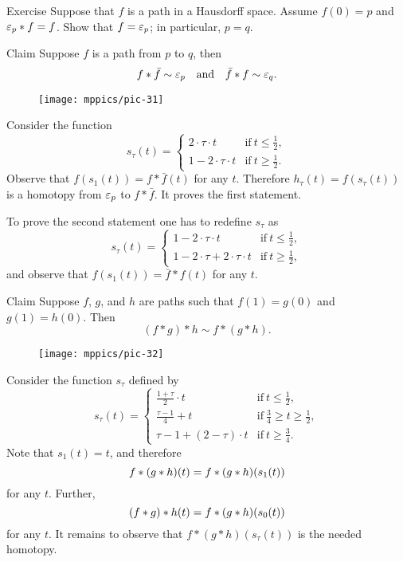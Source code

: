 \begin{thm}{Exercise}\label{ex:neutral}
Suppose that $f$ is a path in a Hausdorff space.
Assume $f(0)=p$ and $\varepsilon_p*f= f$.
Show that $f=\varepsilon_p$; in particular, $p=q$.
\end{thm}

\begin{thm}{Claim}\label{clm:f-bar-f}
Suppose $f$ is a path from $p$ to $q$, then
\[f*\bar f\sim \varepsilon_p
\quad\text{and}\quad
\bar f*f\sim \varepsilon_q.\]
\end{thm}

{

\begin{wrapfigure}[12]{r}{30mm}
\centering
\texttt{[image: mppics/pic-31]}
\end{wrapfigure}

Consider the function
\[s_\tau(t)=
\begin{cases}
2\cdot \tau \cdot t&\text{if}\ t\le \tfrac12,
\\
1-2\cdot \tau \cdot t&\text{if}\ t\ge \tfrac12.
\end{cases}
\]
Observe that $f(s_1(t))=f*\bar f(t)$ for any $t$.
Therefore $h_\tau(t)=f(s_\tau(t))$ is a homotopy from $\varepsilon_p$ to $f*\bar f$.
It proves the first statement.



To prove the second statement one has to redefine $s_\tau$ as
\[s_\tau(t)=
\begin{cases}
1-2\cdot \tau \cdot t&\text{if}\ t\le \tfrac12,
\\
1-2\cdot\tau + 2\cdot \tau \cdot t&\text{if}\ t\ge \tfrac12,
\end{cases}
\]
and observe that $f(s_1(t))=\bar f*f(t)$ for any $t$.
\qeds

}

\begin{thm}{Claim}\label{clm:assoc}
Suppose $f$, 
$g$,
and
$h$ are paths such that $f(1)=g(0)$ and $g(1)=h(0)$.
Then
\[(f*g)*h\sim f*(g*h).\]
\end{thm}

\begin{wrapfigure}[3]{r}{30mm}
\centering
\vskip-4mm
\texttt{[image: mppics/pic-32]}
\end{wrapfigure}

Consider the function $s_\tau$ defined by 
\[s_\tau(t)=
\begin{cases}
\tfrac{1+\tau}2\cdot t&\text{if}\ t\le \tfrac12,
\\
\tfrac{\tau-1}4+t&\text{if}\ \tfrac 34\ge t\ge \tfrac12,
\\
\tau-1+ (2-\tau)\cdot t&\text{if}\  t\ge \tfrac34.
\end{cases}
\]
Note that $s_1(t)=t$,
and therefore \[f*(g*h)(t)\z=f*(g*h)(s_1(t))\] for any $t$.
Further, 
\[(f*g)*h(t)\z=f*(g*h)(s_0(t))\] for any $t$.
It remains to observe that $f*(g*h)(s_\tau(t))$ is the needed homotopy.
\qeds

